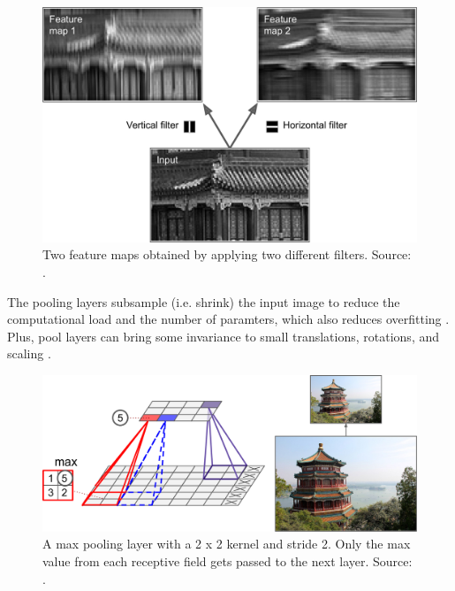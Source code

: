 \documentclass[a4paper, 11pt, oneside]{article}
\begin{document}
  \begin{figure}[ht]
    \begin{center}
      \includegraphics[width=.8\textwidth]{filters.png}
    \end{center}
    \caption{Two feature maps obtained by applying two different filters. Source: \cite{geron2019hands}.}
  \end{figure}

  The pooling layers subsample (i.e. shrink) the input image to reduce the computational load and the number of paramters,
  which also reduces overfitting \cite{geron2019hands}. Plus, pool layers can bring some invariance to small translations,
  rotations, and scaling \cite{geron2019hands}.

  \begin{figure}[ht]
    \begin{center}
      \includegraphics[width=.8\textwidth]{max_pooling.png}
    \end{center}
    \caption{A max pooling layer with a 2 x 2 kernel and stride 2. Only the max value from each receptive field
    gets passed to the next layer. Source: \cite{geron2019hands}.}
  \end{figure}
\end{document}
